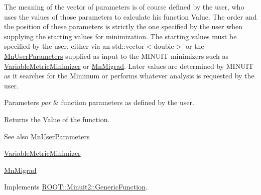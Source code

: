 The meaning of the vector of parameters is of course defined by the user, who uses the values of those parameters to calculate his function Value. The order and the position of these parameters is strictly the one specified by the user when supplying the starting values for minimization. The starting values must be specified by the user, either via an std\+::vector$<$double$>$ or the \mbox{\hyperlink{classROOT_1_1Minuit2_1_1MnUserParameters}{Mn\+User\+Parameters}} supplied as input to the M\+I\+N\+U\+IT minimizers such as \mbox{\hyperlink{classROOT_1_1Minuit2_1_1VariableMetricMinimizer}{Variable\+Metric\+Minimizer}} or \mbox{\hyperlink{classROOT_1_1Minuit2_1_1MnMigrad}{Mn\+Migrad}}. Later values are determined by M\+I\+N\+U\+IT as it searches for the Minimum or performs whatever analysis is requested by the user.


\begin{DoxyParams}{Parameters}
{\em par} & function parameters as defined by the user.\\
\hline
\end{DoxyParams}
\begin{DoxyReturn}{Returns}
the Value of the function.
\end{DoxyReturn}
\begin{DoxySeeAlso}{See also}
\mbox{\hyperlink{classROOT_1_1Minuit2_1_1MnUserParameters}{Mn\+User\+Parameters}} 

\mbox{\hyperlink{classROOT_1_1Minuit2_1_1VariableMetricMinimizer}{Variable\+Metric\+Minimizer}} 

\mbox{\hyperlink{classROOT_1_1Minuit2_1_1MnMigrad}{Mn\+Migrad}} 
\end{DoxySeeAlso}


Implements \mbox{\hyperlink{classROOT_1_1Minuit2_1_1GenericFunction_a0d6039ad9aa18e475534d1fd80342e9d}{R\+O\+O\+T\+::\+Minuit2\+::\+Generic\+Function}}.



